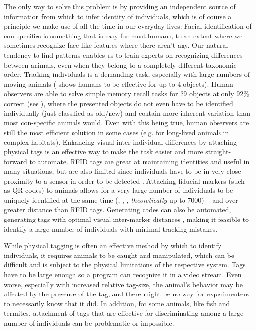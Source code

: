 \documentclass[9pt,lineno]{elife}
\begin{document}
The only way to solve this problem is by providing an independent source of information from which to infer identity of individuals, which is of course a principle we make use of all the time in our everyday lives: Facial identification of con-specifics is something that {\color{blue}is easy for most humans}, to an extent where we sometimes recognize face-like features where there aren't any. Our natural tendency to find patterns enables us to train experts on recognizing differences between animals, even when they belong to a completely different taxonomic order. Tracking individuals is a demanding task, especially with large numbers of moving animals (\citealt{liu2009effect} shows humans to be effective for up to 4 objects). Human observers are able to solve simple memory recall tasks for 39 objects at only 92\% correct (see \citealt{humphrey1992recognizing}), where the presented objects do not even have to be identified individually (just classified as old/new) and contain more inherent variation than most con-specific animals would. Even with this being true, human observers are still the most efficient solution in some cases (e.g. for long-lived animals in complex habitats). Enhancing visual inter-individual differences by attaching physical tags is an effective way to make the task easier and more straight-forward to automate. RFID tags are great at maintaining identities and useful in many situations, but are also limited since individuals have to be in very close proximity to a sensor in order to be detected \citep{bonter2011applications}. Attaching {\color{blue} fiducial markers (such as QR codes)} to animals allows for a very large number of individuals to be uniquely identified at the same time {\color{blue} (\citealt{Gernat1433}, \citealt{Wild2020.05.06.076943},} \citealt{mersch2013tracking}, \citealt{crall2015beetag} \textit{theoretically} up to 7000) -- and over greater distance than RFID tags. Generating codes can also be automated, generating tags with optimal visual inter-marker distances \citep{garrido2016generation}, making it feasible to identify a large number of individuals with minimal tracking mistakes.

While physical tagging is often an effective method by which to identify individuals, it requires animals to be caught and manipulated, which can be difficult \citep{mersch2013tracking} and is subject to the physical limitations of the respective system. Tags have to be large enough so a program can recognize it in a video stream. Even worse, especially with increased relative tag-size, the animal's behavior may be affected by the presence of the tag, and there might be no way for experimenters to necessarily know that it did. In addition, for some animals, like fish and termites, attachment of tags that are effective for discriminating among a large number of individuals can be problematic {\color{blue} \citep{crall2015beetag}} or impossible.
\end{document}
